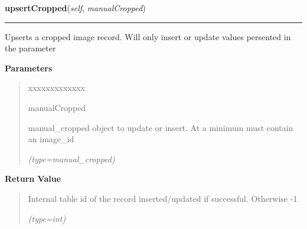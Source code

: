 \hspace{.8\funcindent}\begin{boxedminipage}{\funcwidth}

    \raggedright \textbf{upsertCropped}(\textit{self}, \textit{manualCropped})

    \vspace{-1.5ex}

    \rule{\textwidth}{0.5\fboxrule}
\setlength{\parskip}{2ex}
    Upserts a cropped image record. Will only insert or update values 
    persented in the parameter

\setlength{\parskip}{1ex}
      \textbf{Parameters}
      \vspace{-1ex}

      \begin{quote}
        \begin{Ventry}{xxxxxxxxxxxxx}

          \item[manualCropped]

          manual\_cropped object to update or insert. At a minimum must 
          contain an image\_id

            {\it (type=manual\_cropped)}

        \end{Ventry}

      \end{quote}

      \textbf{Return Value}
    \vspace{-1ex}

      \begin{quote}
      Internal table id of the record inserted/updated if successful. 
      Otherwise -1

      {\it (type=int)}

      \end{quote}

    \end{boxedminipage}

    \label{src:dao:manual_cropped_dao:ManualCroppedDAO:addImage}

    \vspace{0.5ex}

